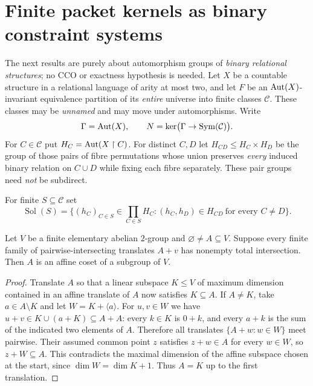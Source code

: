 \section{Finite packet kernels as binary constraint systems}
\label{sec:finite-kernel-csp}

The next results are purely about automorphism groups of
\emph{binary relational structures}; no CCO or exactness
hypothesis is needed. Let $X$ be a countable structure in a
relational language of arity at most two, and let $F$ be an
$\operatorname{Aut}(X)$-invariant equivalence partition of its \emph{entire}
universe into finite classes $\mathcal C$. These classes may
be \emph{unnamed} and may move under automorphisms.
Write
\[
 \Gamma=\operatorname{Aut}(X),\qquad
 N=\ker\bigl(\Gamma\to\operatorname{Sym}(\mathcal C)\bigr).
\]
For $C\in\mathcal C$ put $H_C=\operatorname{Aut}(X\restriction C)$.
For distinct $C,D$ let $H_{CD}\le H_C\times H_D$
be the group of those pairs of fibre permutations whose
union preserves \emph{every} induced binary relation
on $C\cup D$ while fixing each fibre separately.
These pair groups need \emph{not} be subdirect.

For finite $S\subseteq\mathcal C$ set
\[
 \operatorname{Sol}(S)=
 \{(h_C)_{C\in S}\in\prod_{C\in S}H_C:
      (h_C,h_D)\in H_{CD}\ \text{for every }C\ne D\}.
\]

\begin{lemma}
\label{lem:foundational-affine-translate-helly}
Let $V$ be a finite elementary abelian $2$-group and
$\varnothing\ne A\subseteq V$. Suppose every finite family
of pairwise-intersecting translates $A+v$ has nonempty
total intersection. Then $A$ is an affine coset of a
subgroup of $V$.
\end{lemma}
\begin{proof}
Translate $A$ so that a linear subspace $K\le V$
of maximum dimension contained in an affine
translate of $A$ now satisfies $K\subseteq A$.
If $A\ne K$, take $a\in A\setminus K$
and let $W=K+\langle a\rangle$.
For $u,v\in W$ we have
$u+v\in K\cup(a+K)\subseteq A+A$:
every $k\in K$ is $0+k$, and every
$a+k$ is the sum of the indicated two
elements of $A$. Therefore all translates
$\{A+w:w\in W\}$ meet pairwise.
Their assumed common point $z$ satisfies
$z+w\in A$ for every $w\in W$, so
$z+W\subseteq A$. This contradicts the
maximal dimension of the affine subspace
chosen at the start, since
$\dim W=\dim K+1$. Thus $A=K$
up to the first translation.
\end{proof}

